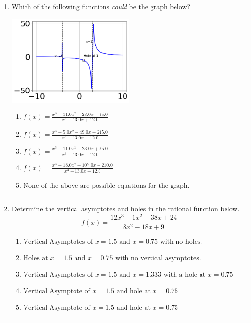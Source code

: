 \documentclass[14pt]{extbook}
\newcommand{\litem}[1]{\item#1\hspace*{-1cm}\rule{\textwidth}{0.4pt}}
\begin{document}
\begin{enumerate}
{\begin{enumerate}[label=\Alph*.]
\end{enumerate} }
\litem{
Which of the following functions \textit{could} be the graph below?
\begin{center}
    \includegraphics[width=0.5\textwidth]{../Figures/identifyGraphOfRationalFunctionB.png}
\end{center}
\begin{enumerate}[label=\Alph*.]
\item \( f(x)=\frac{x^{3} +11.0 x^{2} +23.0 x -35.0}{x^{3} -13.0 x + 12.0} \)
\item \( f(x)=\frac{x^{3} -5.0 x^{2} -49.0 x + 245.0}{x^{3} -13.0 x -12.0} \)
\item \( f(x)=\frac{x^{3} -11.0 x^{2} +23.0 x + 35.0}{x^{3} -13.0 x -12.0} \)
\item \( f(x)=\frac{x^{3} +18.0 x^{2} +107.0 x + 210.0}{x^{3} -13.0 x + 12.0} \)
\item \( \text{None of the above are possible equations for the graph.} \)

\end{enumerate} }
\litem{
Determine the vertical asymptotes and holes in the rational function below.\[ f(x) = \frac{12x^{3} -1 x^{2} -38 x + 24}{8x^{2} -18 x + 9} \]\begin{enumerate}[label=\Alph*.]
\item \( \text{Vertical Asymptotes of } x = 1.5 \text{ and } x = 0.75 \text{ with no holes.} \)
\item \( \text{Holes at } x = 1.5 \text{ and } x = 0.75 \text{ with no vertical asymptotes.} \)
\item \( \text{Vertical Asymptotes of } x = 1.5 \text{ and } x = 1.333 \text{ with a hole at } x = 0.75 \)
\item \( \text{Vertical Asymptote of } x = 1.5 \text{ and hole at } x = 0.75 \)
\item \( \text{Vertical Asymptote of } x = 1.5 \text{ and hole at } x = 0.75 \)


\end{enumerate}}
\end{enumerate}
\end{document}
